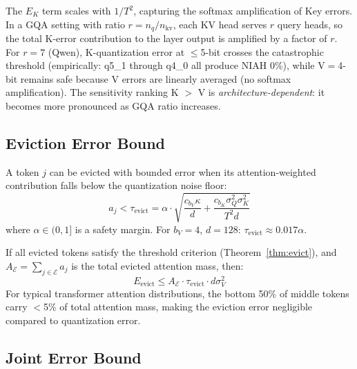 \begin{remark}
The $E_K$ term scales with $1/T^2$, capturing the softmax amplification of Key errors. In a GQA setting with ratio $r = n_q / n_\text{kv}$, each KV head serves $r$ query heads, so the total K-error contribution to the layer output is amplified by a factor of $r$. For $r = 7$ (Qwen), K-quantization error at $\leq$5-bit crosses the catastrophic threshold (empirically: q5\_1 through q4\_0 all produce NIAH 0\%), while V$=$4-bit remains safe because V errors are linearly averaged (no softmax amplification). The sensitivity ranking K $>$ V is \emph{architecture-dependent}: it becomes more pronounced as GQA ratio increases.
\end{remark}

\subsection{Eviction Error Bound}

\begin{theorem}
\label{thm:evict}
A token $j$ can be evicted with bounded error when its attention-weighted contribution falls below the quantization noise floor:
\begin{equation}
    a_j < \tau_{\text{evict}} = \alpha \cdot \sqrt{\frac{c_{b_V} \kappa}{d} + \frac{c_{b_K} \sigma_Q^2 \sigma_K^2}{T^2 d}}
\end{equation}
where $\alpha \in (0, 1]$ is a safety margin. For $b_V = 4$, $d = 128$: $\tau_{\text{evict}} \approx 0.017\alpha$.
\end{theorem}

\begin{theorem}
\label{thm:evict-total}
If all evicted tokens satisfy the threshold criterion (Theorem~\ref{thm:evict}), and $A_{\mathcal{E}} = \sum_{j \in \mathcal{E}} a_j$ is the total evicted attention mass, then:
\begin{equation}
    E_{\text{evict}} \leq A_{\mathcal{E}} \cdot \tau_{\text{evict}} \cdot d \sigma_V^2
\end{equation}
For typical transformer attention distributions, the bottom 50\% of middle tokens carry $<$5\% of total attention mass, making the eviction error negligible compared to quantization error.
\end{theorem}

\subsection{Joint Error Bound}

